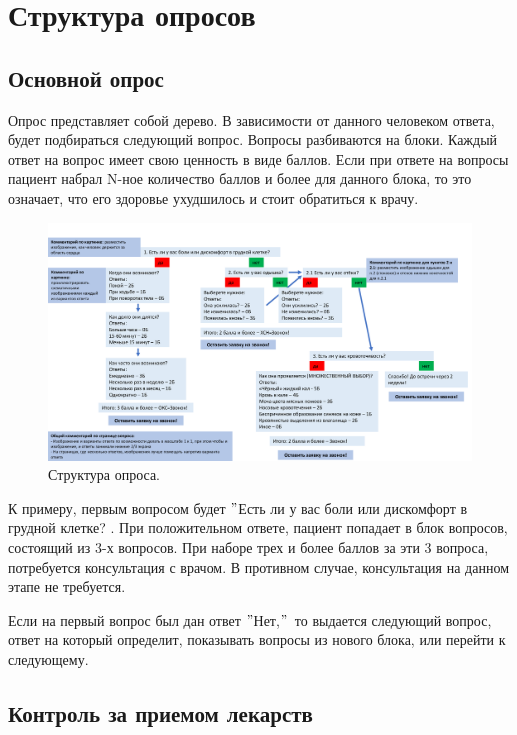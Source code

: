 \section{Структура опросов}\label{sec:-}

\subsection{Основной опрос}\label{subsec:-}

Опрос представляет собой дерево.
В зависимости от данного человеком ответа, будет подбираться следующий вопрос.
Вопросы разбиваются на блоки.
Каждый ответ на вопрос имеет свою ценность в виде баллов.
Если при ответе на вопросы пациент набрал N-ное количество баллов и более для данного блока, то это означает, что его здоровье ухудшилось и стоит обратиться к врачу.

\begin{figure}[h]
    \includegraphics[scale=0.175]{images/presentation/1cbc101521d4d97c799189ce193d279d-0}
    \caption{Структура опроса.}\label{fig:figure}
\end{figure}

К примеру, первым вопросом будет \("\)Есть ли у вас боли или дискомфорт в грудной клетке?
.
При положительном ответе, пациент попадает в блок вопросов, состоящий из 3-х вопросов.
При наборе трех и более баллов за эти 3 вопроса, потребуется консультация с врачом.
В противном случае, консультация на данном этапе не требуется. \par
Если на первый вопрос был дан ответ \("\)Нет,\("\)\, то выдается следующий вопрос, ответ на который определит, показывать вопросы из нового блока, или перейти к следующему.

\subsection{Контроль за приемом лекарств}\label{subsec:---}

